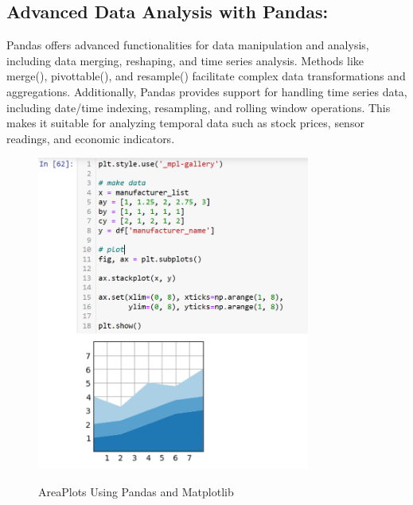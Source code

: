 \documentclass{article}
\begin{document}
{\newpage
\subsection{Advanced Data Analysis with Pandas:}

Pandas offers advanced functionalities for data manipulation and analysis, including data merging, reshaping, and time series analysis. Methods like merge(), pivot\textunderscore table(), and resample() facilitate complex data transformations and aggregations.
Additionally, Pandas provides support for handling time series data, including date/time indexing, resampling, and rolling window operations. This makes it suitable for analyzing temporal data such as stock prices, sensor readings, and economic indicators.
\\
\begin{figure}[htbp]
  \centering
  \vspace{0.3cm}
  \includegraphics[width=0.8\textwidth]{Figures/Python/analysis using matplotlib.png}\\
  \caption{AreaPlots Using Pandas and Matplotlib}
  \vspace{0.3cm}
\end{figure}
\\
}




\newpage
\end{document}
